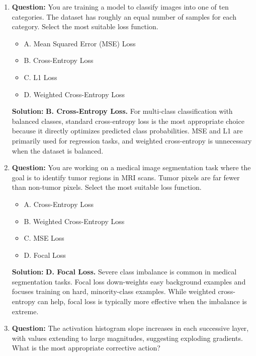 \documentclass{article}
\begin{document}
\begin{enumerate}

\item \textbf{Question:}  
You are training a model to classify images into one of ten categories. The dataset has roughly an equal number of samples for each category. Select the most suitable loss function.

\begin{itemize}
    \item A. Mean Squared Error (MSE) Loss
    \item B. Cross-Entropy Loss
    \item C. L1 Loss
    \item D. Weighted Cross-Entropy Loss
\end{itemize}

\textbf{Solution:}  
\textbf{B. Cross-Entropy Loss.}  
For multi-class classification with balanced classes, standard cross-entropy loss is the most appropriate choice because it directly optimizes predicted class probabilities. MSE and L1 are primarily used for regression tasks, and weighted cross-entropy is unnecessary when the dataset is balanced.

\medskip

\item \textbf{Question:}  
You are working on a medical image segmentation task where the goal is to identify tumor regions in MRI scans. Tumor pixels are far fewer than non-tumor pixels. Select the most suitable loss function.

\begin{itemize}
    \item A. Cross-Entropy Loss
    \item B. Weighted Cross-Entropy Loss
    \item C. MSE Loss
    \item D. Focal Loss
\end{itemize}

\textbf{Solution:}  
\textbf{D. Focal Loss.}  
Severe class imbalance is common in medical segmentation tasks. Focal loss down-weights easy background examples and focuses training on hard, minority-class examples. While weighted cross-entropy can help, focal loss is typically more effective when the imbalance is extreme.

\medskip

\item \textbf{Question:}  
The activation histogram slope increases in each successive layer, with values extending to large magnitudes, suggesting exploding gradients. What is the most appropriate corrective action?


\end{enumerate}
\end{document}
